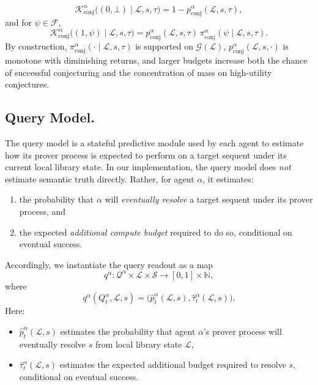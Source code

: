 \[
\mathcal K^\alpha_{\mathrm{conj}}\big((0,\bot)\mid \mathcal L,s,\tau\big)
=
1-p^\alpha_{\mathrm{conj}}(\mathcal L,s,\tau),
\]
and for $\psi\in\mathcal F$,
\[
\mathcal K^\alpha_{\mathrm{conj}}\big((1,\psi)\mid \mathcal L,s,\tau\big)
=
p^\alpha_{\mathrm{conj}}(\mathcal L,s,\tau)\,\pi^\alpha_{\mathrm{conj}}(\psi\mid \mathcal L,s,\tau).
\]
By construction, $\pi^\alpha_{\mathrm{conj}}(\cdot\mid \mathcal L,s,\tau)$ is supported on $\mathcal G(\mathcal L)$, $p^\alpha_{\mathrm{conj}}(\mathcal L,s,\cdot)$ is monotone with diminishing returns, and larger budgets increase both the chance of successful conjecturing and the concentration of mass on high-utility conjectures.

\subsection{Query Model.}

The query model is a stateful predictive module used by each agent to estimate how its prover process is expected to perform on a target sequent under its current local library state. In our implementation, the query model does \emph{not} estimate semantic truth directly. Rather, for agent $\alpha$, it estimates:

\begin{enumerate}
    \item the probability that $\alpha$ will \emph{eventually resolve} a target sequent under its prover process, and
    \item the expected \emph{additional compute budget} required to do so, conditional on eventual success.
\end{enumerate}

Accordingly, we instantiate the query readout as a map
\[
q^\alpha : \mathcal Q^\alpha \times \mathscr L \times \mathcal S \to [0,1]\times \mathbb N,
\]
where
\[
q^\alpha(Q^\alpha_t,\mathcal L,s)
=
\big(\hat p^\alpha_t(\mathcal L,s),\hat \tau^\alpha_t(\mathcal L,s)\big).
\]
Here:
\begin{itemize}
    \item $\hat p^\alpha_t(\mathcal L,s)$ estimates the probability that agent $\alpha$'s prover process will eventually resolve $s$ from local library state $\mathcal L$,
    \item $\hat\tau^\alpha_t(\mathcal L,s)$ estimates the expected additional budget required to resolve $s$, conditional on eventual success.
\end{itemize}

